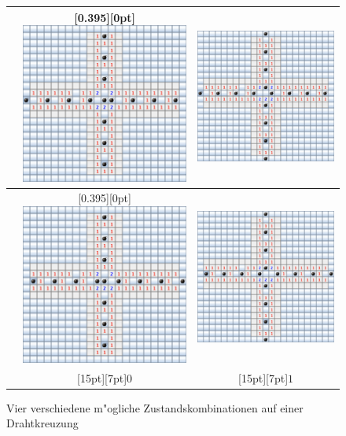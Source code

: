 \begin{figure}
\begin{center}
\begin{tabular}{|l|c|c|}
\hline
\raisebox{12ex}{$0$}&
\raisebox{0pt}[0.395\hsize][0pt]{%
\includegraphics[width=0.4\hsize]{graphics/cross-11}}&
\includegraphics[width=0.4\hsize]{graphics/cross-10}\\
\hline
\raisebox{12ex}{$1$}&
\raisebox{0pt}[0.395\hsize][0pt]{%
\includegraphics[width=0.4\hsize]{graphics/cross-01}}&
\includegraphics[width=0.4\hsize]{graphics/cross-00}\\
\hline
&\raisebox{0pt}[15pt][7pt]{$0$}&%
\raisebox{0pt}[15pt][7pt]{$1$}\\
\hline
\end{tabular}
\end{center}
\caption{Vier verschiedene m"ogliche Zustandskombinationen auf
einer Drahtkreuzung\label{minesweeper-crosses}}
\end{figure}%

